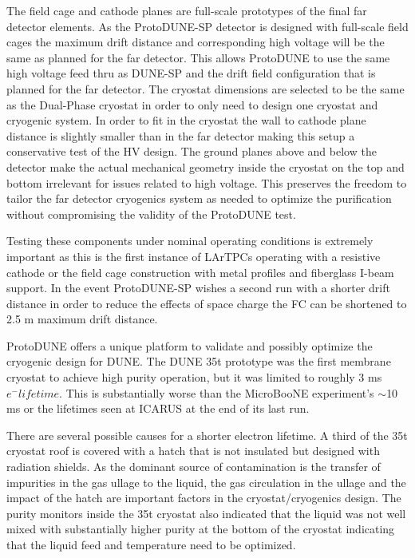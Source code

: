 The field cage and cathode planes are full-scale prototypes of the final far detector elements. As the ProtoDUNE-SP detector is designed with full-scale field cages the maximum drift distance and corresponding high voltage will be the same as planned for the far detector. This allows ProtoDUNE to use the same high voltage feed thru as DUNE-SP and the drift field configuration that is planned for the far detector. The cryostat dimensions are selected to be the same as the Dual-Phase cryostat in order to only need to design one cryostat and cryogenic system. In order to fit in the cryostat the wall to cathode plane distance is slightly smaller than in the far detector making this setup a conservative test of the HV design. The ground planes above and below the detector make the actual mechanical geometry inside the cryostat on the top and bottom irrelevant for issues related to high voltage. This preserves the freedom to tailor the far detector cryogenics system as needed to optimize the purification without compromising the validity of the ProtoDUNE test. 

Testing these components under nominal operating conditions is extremely important as this is the first instance of LArTPCs operating with a resistive cathode or the field cage construction with metal profiles and fiberglass I-beam support. In the event ProtoDUNE-SP wishes a second run with a shorter drift distance in order to reduce the effects of space charge the FC can be shortened to 2.5 m maximum drift distance.

ProtoDUNE offers a unique platform to validate and possibly optimize the cryogenic design for DUNE. The DUNE 35t prototype was the first membrane cryostat to achieve high purity operation, but it was limited to roughly 3 ms $e^-lifetime$. This is substantially worse than the MicroBooNE experiment's  $\sim$10 ms or the lifetimes seen at ICARUS at the end of its last run. 

There are several possible causes for a shorter electron lifetime.  A third of the 35t cryostat roof is covered with a hatch that is not insulated but designed with radiation shields. As the dominant source of contamination is the transfer of impurities in the gas ullage to the liquid, the gas circulation in the ullage and the impact of the hatch are important factors in the cryostat/cryogenics design. The purity monitors inside the 35t cryostat also indicated that the liquid was not well mixed with substantially higher purity at the bottom of the cryostat indicating that the liquid feed and temperature need to be optimized.  

